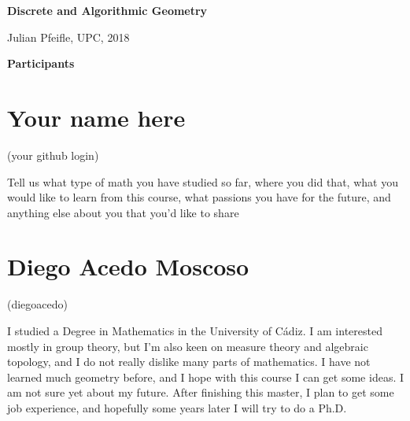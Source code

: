 \documentclass[11pt]{amsart}
\begin{document}
\begin{center}
\textbf{\sffamily
   Discrete and Algorithmic Geometry }

\medskip
   Julian Pfeifle,
   UPC, 2018
\end{center}

\bigskip

\begin{center}
  \textbf{\sffamily Participants}
\end{center}

\medskip

\section*{Your name here}
(your github login)

Tell us what type of math you have studied so far, where you did that, what you would like to learn from this course, what passions you have for the future, and anything else about you that you'd like to share

\medskip

\section*{Diego Acedo Moscoso}
(diegoacedo)

I studied a Degree in Mathematics in the University of Cádiz. I am interested mostly in group theory, but I'm also keen on measure theory and algebraic topology, and I do not really dislike many parts of mathematics. I have not learned much geometry before, and I hope with this course I can get some ideas.
I am not sure yet about my future. After finishing this master, I plan to get some job experience, and hopefully some years later I will try to do a Ph.D.
\end{document}
